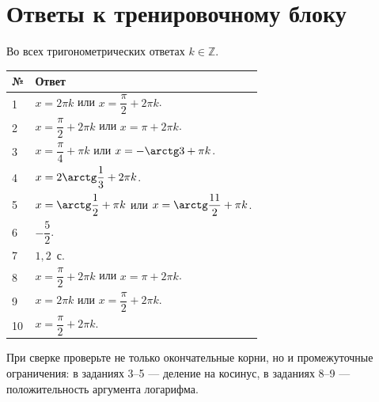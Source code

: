 \documentclass[a4paper,12pt]{article}
\begin{document}
\section*{Ответы к тренировочному блоку}
\textcolor{textgray}{Во всех тригонометрических ответах $k\in\mathbb Z$.}\par\medskip\noindent
\renewcommand{\arraystretch}{1.55}
\begingroup\small
\begin{tabularx}{\linewidth}{@{}p{9mm}X@{}}
\toprule
\textbf{№}&\textbf{Ответ}\\
\midrule
1 & $x=2\pi k$ или $x=\dfrac\pi2+2\pi k$.\\
2 & $x=\dfrac\pi2+2\pi k$ или $x=\pi+2\pi k$.\\
3 & $x=\dfrac\pi4+\pi k$ или $x=-\arctg3+\pi k$.\\
4 & $x=2\arctg\dfrac13+2\pi k$.\\
5 & $x=\arctg\dfrac12+\pi k$ или $x=\arctg\dfrac{11}{2}+\pi k$.\\
6 & $-\dfrac52$.\\
7 & $1,2$~с.\\
8 & $x=\dfrac\pi2+2\pi k$ или $x=\pi+2\pi k$.\\
9 & $x=2\pi k$ или $x=\dfrac\pi2+2\pi k$.\\
10 & $x=\dfrac\pi2+2\pi k$.\\
\bottomrule
\end{tabularx}\par
\endgroup
\vspace{7mm}\noindent
\textcolor{textgray}{При сверке проверьте не только окончательные корни, но и промежуточные ограничения: в заданиях 3--5 --- деление на косинус, в заданиях 8--9 --- положительность аргумента логарифма.}
\end{document}
